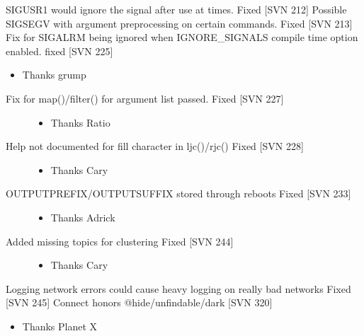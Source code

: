 \documentclass[letterpaper,10pt,english]{sphinxmanual}
\begin{document}
\sphinxAtStartPar
SIGUSR1 would ignore the signal after use at times.  Fixed {[}SVN 212{]}
Possible SIGSEGV with argument preprocessing on certain commands.  Fixed {[}SVN 213{]}
Fix for SIGALRM being ignored when IGNORE\_SIGNALS compile time option enabled. fixed {[}SVN 225{]}
\begin{itemize}
\item {} 
\sphinxAtStartPar
Thanks grump

\end{itemize}
\begin{description}
\item[{Fix for map()/filter() for argument list passed.  Fixed {[}SVN 227{]}}] \leavevmode\begin{itemize}
\item {} 
\sphinxAtStartPar
Thanks Ratio

\end{itemize}

\item[{Help not documented for fill character in ljc()/rjc() \sphinxhyphen{} Fixed {[}SVN 228{]}}] \leavevmode\begin{itemize}
\item {} 
\sphinxAtStartPar
Thanks Cary

\end{itemize}

\item[{OUTPUTPREFIX/OUTPUTSUFFIX stored through reboots \sphinxhyphen{} Fixed {[}SVN 233{]}}] \leavevmode\begin{itemize}
\item {} 
\sphinxAtStartPar
Thanks Adrick

\end{itemize}

\item[{Added missing topics for clustering \sphinxhyphen{} Fixed {[}SVN 244{]}}] \leavevmode\begin{itemize}
\item {} 
\sphinxAtStartPar
Thanks Cary

\end{itemize}

\end{description}

\sphinxAtStartPar
Logging network errors could cause heavy logging on really bad networks \sphinxhyphen{} Fixed {[}SVN 245{]}
Connect honors @hide/unfindable/dark {[}SVN 320{]}
\begin{itemize}
\item {} 
\sphinxAtStartPar
Thanks Planet X

\end{itemize}
\end{document}
